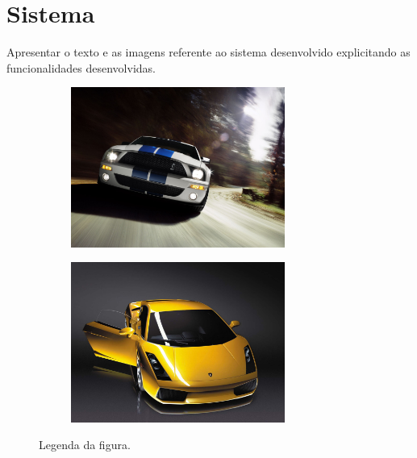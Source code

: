 \section{Sistema}

Apresentar o texto e as imagens referente ao sistema desenvolvido explicitando as
funcionalidades desenvolvidas.

\begin{figure}[htbp]
\centering
    \begin{subfigure}[b]{7cm}
        \centering
        \includegraphics[width=7cm]{anexos/sub1fig2.jpg} %
        \label{fig2:sub1}
    \end{subfigure}
\quad
    \begin{subfigure}[b]{7cm}
        \centering
        \includegraphics[width=7cm]{anexos/sub2fig2.jpg} %
        \label{fig2:sub2}
    \end{subfigure}
\caption{
Legenda da figura.
}
\label{fig:fig2} %
\end{figure}